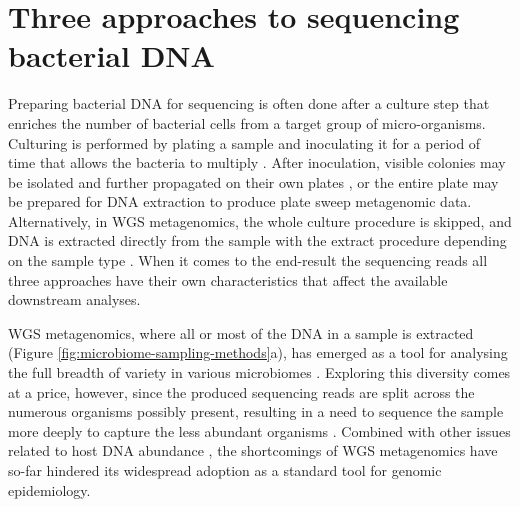 \documentclass[officiallayout]{tktla}
\begin{document}
\section{Three approaches to sequencing bacterial DNA}
\label{three-approaches-to-metagenomics}


Preparing bacterial DNA for sequencing is often done after a culture
step that enriches the number of bacterial cells from a target group
of micro-organisms. Culturing is performed by plating a sample and
inoculating it for a period of time that allows the bacteria to
multiply \citep{sanders2012aseptic}. After inoculation, visible
colonies may be isolated and further propagated on their own plates
\citep{sanders2012aseptic}, or the entire plate may be prepared for DNA
extraction to produce plate sweep metagenomic data. Alternatively, in
WGS metagenomics, the whole culture procedure is skipped, and DNA is
extracted directly from the sample with the extract procedure
depending on the sample type \citep{bachmann2018advances}. When it
comes to the end-result \textemdash{ } the sequencing reads
\textemdash{ } all three approaches have their own characteristics
that affect the available downstream analyses.

WGS metagenomics, where all or most of the DNA in a sample is
extracted (Figure \ref{fig:microbiome-sampling-methods}a), has emerged
as a tool for analysing the full breadth of variety in various
microbiomes \citep{shao2019stunted, ghensi2020strong,
  bertrand2019hybrid, danko2021global, whelan2020culture}. Exploring
this diversity comes at a price, however, since the produced
sequencing reads are split across the numerous organisms possibly
present, resulting in a need to sequence the sample more deeply to
capture the less abundant organisms \citep{whelan2020culture,
  vollmers2017comparing, quince2017shotgun}. Combined with other
issues related to host DNA abundance \citep{whelan2020culture, ivy2018direct, gu2019clinical}, the shortcomings of WGS metagenomics have
so-far hindered its widespread adoption as a standard tool for
genomic epidemiology.
\end{document}
